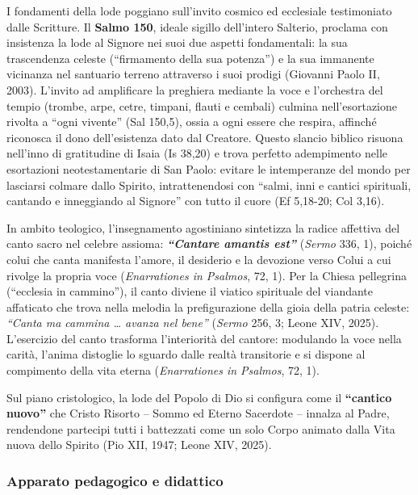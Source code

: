 \documentclass[12pt,a4paper]{article}
\begin{document}
	I fondamenti della lode poggiano sull'invito cosmico ed ecclesiale testimoniato dalle Scritture. Il \textbf{Salmo 150}, ideale sigillo dell'intero Salterio, proclama con insistenza la lode al Signore nei suoi due aspetti fondamentali: la sua trascendenza celeste (``firmamento della sua potenza'') e la sua immanente vicinanza nel santuario terreno attraverso i suoi prodigi (Giovanni Paolo II, 2003). L'invito ad amplificare la preghiera mediante la voce e l'orchestra del tempio (trombe, arpe, cetre, timpani, flauti e cembali) culmina nell'esortazione rivolta a ``ogni vivente'' (Sal 150,5), ossia a ogni essere che respira, affinché riconosca il dono dell'esistenza dato dal Creatore. Questo slancio biblico risuona nell'inno di gratitudine di Isaia (Is 38,20) e trova perfetto adempimento nelle esortazioni neotestamentarie di San Paolo: evitare le intemperanze del mondo per lasciarsi colmare dallo Spirito, intrattenendosi con ``salmi, inni e cantici spirituali, cantando e inneggiando al Signore'' con tutto il cuore (Ef 5,18-20; Col 3,16).
	
	In ambito teologico, l'insegnamento agostiniano sintetizza la radice affettiva del canto sacro nel celebre assioma: \textbf{\emph{``Cantare amantis est''}} (\emph{Sermo} 336, 1), poiché colui che canta manifesta l'amore, il desiderio e la devozione verso Colui a cui rivolge la propria voce (\emph{Enarrationes in Psalmos}, 72, 1). Per la Chiesa pellegrina (``ecclesia in cammino''), il canto diviene il viatico spirituale del viandante affaticato che trova nella melodia la prefigurazione della gioia della patria celeste: \emph{``Canta ma cammina \ldots{} avanza nel bene''} (\emph{Sermo} 256, 3; Leone XIV, 2025). L'esercizio del canto trasforma l'interiorità del cantore: modulando la voce nella carità, l'anima distoglie lo sguardo dalle realtà transitorie e si dispone al compimento della vita eterna (\emph{Enarrationes in Psalmos}, 72, 1).
	
	Sul piano cristologico, la lode del Popolo di Dio si configura come il \textbf{``cantico nuovo''} che Cristo Risorto -- Sommo ed Eterno Sacerdote -- innalza al Padre, rendendone partecipi tutti i battezzati come un solo Corpo animato dalla Vita nuova dello Spirito (Pio XII, 1947; Leone XIV, 2025).
	
	\subsubsection{Apparato pedagogico e didattico}\label{apparato-pedagogico-e-didattico}
	
\end{document}
